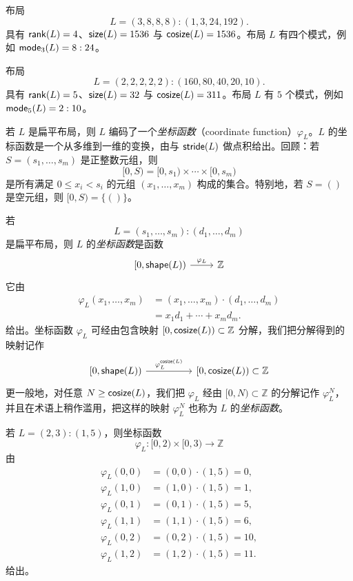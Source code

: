 \begin{example}
布局
\[
L = (3,8,8,8) : (1,3,24,192).
\]
具有 $\mathsf{rank}(L) = 4$、$\mathsf{size}(L) = 1536$ 与 $\mathsf{cosize}(L) = 1536$。布局 $L$ 有四个模式，例如 $\mathsf{mode}_3(L) = 8:24$。
\end{example}

\begin{example}
布局
\[
L = (2,2,2,2,2) : (160,80,40,20,10).
\]
具有 $\mathsf{rank}(L) = 5$、$\mathsf{size}(L) = 32$ 与 $\mathsf{cosize}(L) = 311$。布局 $L$ 有 $5$ 个模式，例如 $\mathsf{mode}_5(L) = 2:10$。
\end{example}

若 $L$ 是扁平布局，则 $L$ 编码了一个{\it 坐标函数}（coordinate function）$\varphi_L$。$L$ 的坐标函数是一个从多维到一维的变换，由与 $\mathsf{stride}(L)$ 做点积给出。回顾：若 $S = (s_1,\dots,s_m)$ 是正整数元组，则
\[
[0,S) = [0,s_1) \times \cdots \times [0,s_m)
\]
是所有满足 $0 \leq x_i < s_i$ 的元组 $(x_1,\dots,x_m)$ 构成的集合。特别地，若 $S = ()$ 是空元组，则 $[0,S) = \{()\}$。

\begin{construction}[坐标函数]\label{constructionofcoordinatefunctions}
若
\[
L = (s_1,\dots,s_m):(d_1,\dots,d_m)
\]
是扁平布局，则 $L$ 的{\it 坐标函数}是函数
\[\begin{tikzcd}
{[}0,\shape(L){)} \ar[r,"\varphi_L"] &  \mathbb{Z}
\end{tikzcd} \]
它由
\begin{align*}
\varphi_L(x_1,\dots,x_m) & = (x_1,\dots,x_m) \cdot (d_1,\dots,d_m)\\
& = x_1 d_1 + \cdots + x_m d_m.
\end{align*}
给出。坐标函数 $\varphi_L$ 可经由包含映射 $[0,\mathsf{cosize}(L)) \subset \mathbb{Z}$ 分解，我们把分解得到的映射记作
    \[\begin{tikzcd} {[}0,\shape(L){)} \ar[rr,"\varphi_L^{\cosize(L)}"] & & {[}0,\cosize(L){)}\subset \mathbb{Z}
    \end{tikzcd} \]
    更一般地，对任意 $N \geq \mathsf{cosize}(L)$，我们把 $\varphi_L$ 经由 $[0,N) \subset \mathbb{Z}$ 的分解记作 $\varphi_L^N$，并且在术语上稍作滥用，把这样的映射 $\varphi_L^N$ 也称为 $L$ 的{\it 坐标函数}。
\end{construction}

\begin{example}\label{layoutfunctionexample1}
    若 $L = (2,3):(1,5)$，则坐标函数
    \[
    \varphi_L:[0,2) \times [0,3) \to \mathbb{Z}
    \]
    由
    \begin{align*}
    \varphi_L(0,0) & = (0,0) \cdot (1,5) = 0,\\
    \varphi_L(1,0) & = (1,0) \cdot (1,5) = 1,\\
    \varphi_L(0,1) & = (0,1) \cdot (1,5) = 5,\\
    \varphi_L(1,1) & = (1,1) \cdot (1,5) = 6,\\
    \varphi_L(0,2) & = (0,2) \cdot (1,5) = 10,\\
    \varphi_L(1,2) & = (1,2) \cdot (1,5) = 11.
    \end{align*}
    给出。
\end{example}

